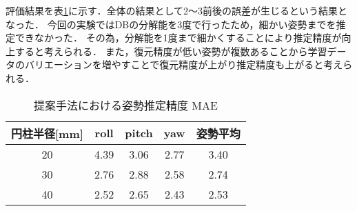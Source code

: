 \documentclass{jsarticle}
\begin{document}
評価結果を表\ref{hyouka}に示す．全体の結果として2～3前後の誤差が生じるという結果となった．
今回の実験ではDBの分解能を3度で行ったため，細かい姿勢までを推定できなかった．
その為，分解能を1度まで細かくすることにより推定精度が向上すると考えられる．
また，復元精度が低い姿勢が複数あることから学習データのバリエーションを増やすことで復元精度が上がり推定精度も上がると考えられる．




\begin{table}[h]
        \vspace{0zh}
          \begin{center}
            \caption{提案手法における姿勢推定精度 MAE}
            \label{hyouka}
            \begin{tabular}{c|c|c|c|c} \hline
              円柱半径[mm]   & roll& pitch & yaw&姿勢平均 \\ \hline
              20& 4.39 & 3.06 & 2.77 &3.40\\ \hline
              30&2.76 & 2.88 & 2.58& 2.74 \\ \hline
              40&2.52 &2.65  &2.43&2.53 \\ \hline
              \end{tabular}
          \end{center}
        \vspace{-1.0zh}
\end{table}



\end{document}
